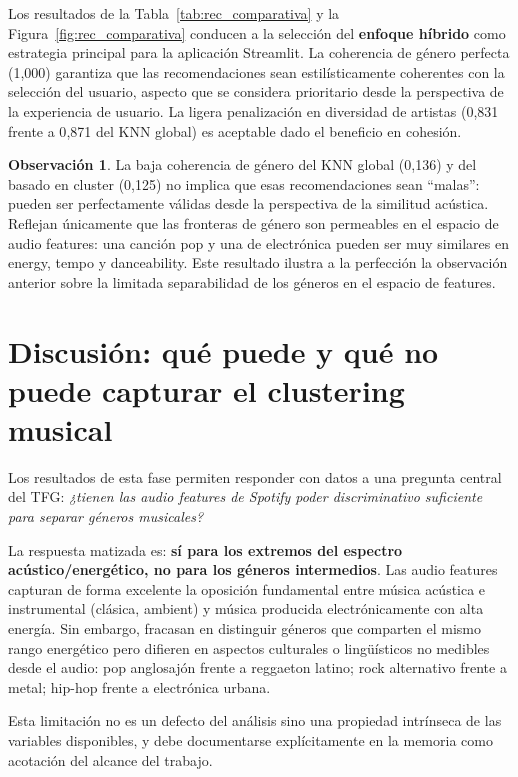 \documentclass[12pt, a4paper]{book}
\theoremstyle{definition}
\newtheorem{observacion}{Observación}[chapter]
\begin{document}
Los resultados de la Tabla~\ref{tab:rec_comparativa} y la
Figura~\ref{fig:rec_comparativa} conducen a la selección del
\textbf{enfoque híbrido} como estrategia principal para la aplicación
Streamlit. La coherencia de género perfecta (1{,}000) garantiza que las
recomendaciones sean estilísticamente coherentes con la selección del usuario,
aspecto que se considera prioritario desde la perspectiva de la experiencia
de usuario. La ligera penalización en diversidad de artistas (0{,}831
frente a 0{,}871 del KNN global) es aceptable dado el beneficio en cohesión.

\begin{observacion}
La baja coherencia de género del KNN global (0{,}136) y del basado en cluster
(0{,}125) no implica que esas recomendaciones sean ``malas'': pueden ser
perfectamente válidas desde la perspectiva de la similitud acústica.
Reflejan únicamente que las fronteras de género son permeables en el espacio
de audio features: una canción pop y una de electrónica pueden ser muy
similares en energy, tempo y danceability. Este resultado ilustra a la
perfección la observación anterior sobre la limitada separabilidad de los
géneros en el espacio de features.
\end{observacion}

\section{Discusión: qué puede y qué no puede capturar el clustering musical}

Los resultados de esta fase permiten responder con datos a una pregunta
central del TFG: \textit{¿tienen las audio features de Spotify poder
discriminativo suficiente para separar géneros musicales?}

La respuesta matizada es: \textbf{sí para los extremos del espectro
acústico/energético, no para los géneros intermedios}. Las audio features
capturan de forma excelente la oposición fundamental entre música acústica
e instrumental (clásica, ambient) y música producida electrónicamente con
alta energía. Sin embargo, fracasan en distinguir géneros que comparten el
mismo rango energético pero difieren en aspectos culturales o lingüísticos
no medibles desde el audio: pop anglosajón frente a reggaeton latino; rock
alternativo frente a metal; hip-hop frente a electrónica urbana.

Esta limitación no es un defecto del análisis sino una propiedad intrínseca
de las variables disponibles, y debe documentarse explícitamente en la
memoria como acotación del alcance del trabajo.
\end{document}
